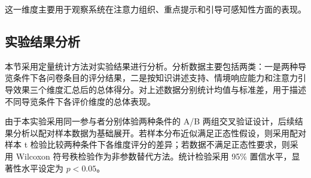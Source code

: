 这一维度主要用于观察系统在注意力组织、重点提示和引导可感知性方面的表现。


\subsection{实验结果分析}
本节采用定量统计方法对实验结果进行分析。分析数据主要包括两类：一是两种导览条件下各问卷条目的评分结果，二是按知识讲述支持、情境响应能力和注意力引导效果三个维度汇总后的总体得分。对上述数据分别统计均值与标准差，用于描述不同导览条件下各评价维度的总体表现。

由于本实验采用同一参与者分别体验两种条件的 A/B 两组交叉验证设计，后续结果分析以配对样本数据为基础展开。若样本分布近似满足正态性假设，则采用配对样本 t 检验比较两种条件下各维度评分的差异；若数据不满足正态性要求，则采用 Wilcoxon 符号秩检验作为非参数替代方法。统计检验采用 95\% 置信水平，显著性水平设定为 $p < 0.05$。
